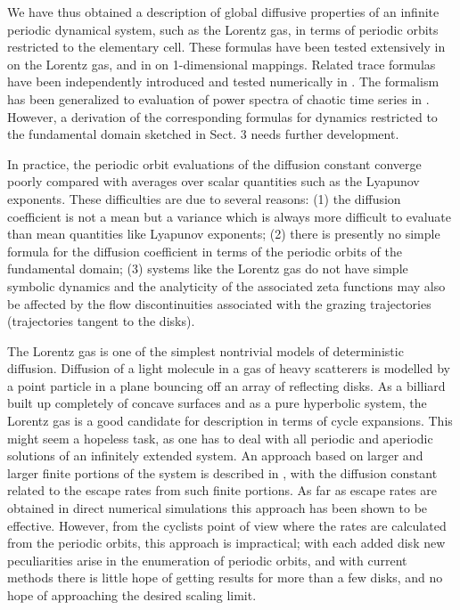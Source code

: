 We have thus obtained a description of global diffusive
properties of an infinite periodic dynamical
system, such as the Lorentz gas, in terms of periodic orbits
restricted to the elementary cell.
These formulas have been tested extensively
in  on the Lorentz gas, and in  on 1-dimensional
mappings.
Related trace formulas have been independently introduced
and tested numerically in .
The formalism has been generalized to evaluation of
power spectra of chaotic time series in .
However, a derivation of the corresponding formulas for dynamics restricted
to the fundamental domain sketched in Sect. 3 needs further development.

In practice, the periodic orbit evaluations
of the diffusion constant converge poorly compared with averages over scalar
quantities such as the Lyapunov exponents.  These difficulties are due to
several reasons: (1) the diffusion coefficient is not a mean but a variance
which is always more difficult to evaluate than mean quantities like Lyapunov exponents;
(2) there is presently no simple formula for the diffusion
coefficient in terms of the periodic orbits of the fundamental domain; (3)
systems like the Lorentz gas do not have simple symbolic dynamics and
the analyticity of the associated zeta functions may also be affected
by the flow discontinuities associated with the grazing trajectories
(trajectories tangent to the disks).


\bigskip

The Lorentz gas is one of the simplest nontrivial models
of deterministic diffusion.
Diffusion of a light molecule in a gas of heavy scatterers
is modelled
by a point particle in a plane bouncing off an array of reflecting disks.
As a billiard built up completely of
concave surfaces and as a pure hyperbolic system, the
Lorentz gas is a good candidate for description in terms of cycle
expansions.
This might seem a hopeless task, as one
has to deal with all periodic and aperiodic
solutions of an infinitely extended system. An
approach based on larger and larger finite portions of the system is described
in , with the diffusion constant related to
the escape rates from such finite portions.
As far as escape rates are obtained in direct numerical simulations
this approach has been shown to be effective.
However, from the cyclists point of view
where the rates are calculated from the periodic orbits,
this approach is impractical; with each added disk new peculiarities arise
in the enumeration of periodic orbits, and with current
methods there is little hope of getting results for more than a few disks,
and no hope of approaching the desired scaling limit.

